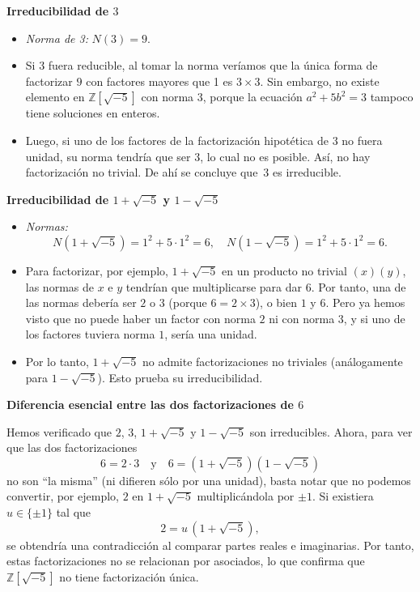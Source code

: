 \medskip

\noindent
\textbf{Irreducibilidad de \(3\)}

\begin{itemize}
    \item \emph{Norma de 3:} \(N(3) = 9\).
    \item Si \(3\) fuera reducible, al tomar la norma veríamos que la única forma de factorizar \(9\) con factores mayores que 1 es \(3 \times 3\). Sin embargo, no existe elemento en \(\mathbb{Z}[\sqrt{-5}]\) con norma \(3\), porque la ecuación \(a^2 + 5b^2 = 3\) tampoco tiene soluciones en enteros.
    \item Luego, si uno de los factores de la factorización hipotética de \(3\) no fuera unidad, su norma tendría que ser \(3\), lo cual no es posible. Así, no hay factorización no trivial. De ahí se concluye que \(\,3\) es irreducible.
\end{itemize}

\medskip

\noindent
\textbf{Irreducibilidad de \(1 + \sqrt{-5}\) y \(1 - \sqrt{-5}\)}

\begin{itemize}
    \item \emph{Normas:} 
    \[
    N(1 + \sqrt{-5}) = 1^2 + 5\cdot1^2 = 6,
    \quad
    N(1 - \sqrt{-5}) = 1^2 + 5\cdot1^2 = 6.
    \]
    \item Para factorizar, por ejemplo, \(1 + \sqrt{-5}\) en un producto no trivial \((x)(y)\), las normas de \(x\) e \(y\) tendrían que multiplicarse para dar \(6\). Por tanto, una de las normas debería ser \(2\) o \(3\) (porque \(6 = 2 \times 3\)), o bien \(1\) y \(6\). Pero ya hemos visto que no puede haber un factor con norma \(2\) ni con norma \(3\), y si uno de los factores tuviera norma \(1\), sería una unidad.  
    \item Por lo tanto, \(1 + \sqrt{-5}\) no admite factorizaciones no triviales (análogamente para \(1 - \sqrt{-5}\)). Esto prueba su irreducibilidad.
\end{itemize}

\bigskip

\noindent
\textbf{Diferencia esencial entre las dos factorizaciones de \(6\)}

\noindent
Hemos verificado que \(2\), \(3\), \(1 + \sqrt{-5}\) y \(1 - \sqrt{-5}\) son irreducibles. Ahora, para ver que las dos factorizaciones
\[
6 = 2 \cdot 3
\quad\text{y}\quad
6 = (1 + \sqrt{-5})(1 - \sqrt{-5})
\]
no son “la misma” (ni difieren sólo por una unidad), basta notar que no podemos convertir, por ejemplo, \(2\) en \(1 + \sqrt{-5}\) multiplicándola por \(\pm1\). Si existiera \(u \in \{\pm 1\}\) tal que 
\[
2 = u\, (1 + \sqrt{-5}),
\]
se obtendría una contradicción al comparar partes reales e imaginarias.  
Por tanto, estas factorizaciones no se relacionan por asociados, lo que confirma que \(\mathbb{Z}[\sqrt{-5}]\) no tiene factorización única.

